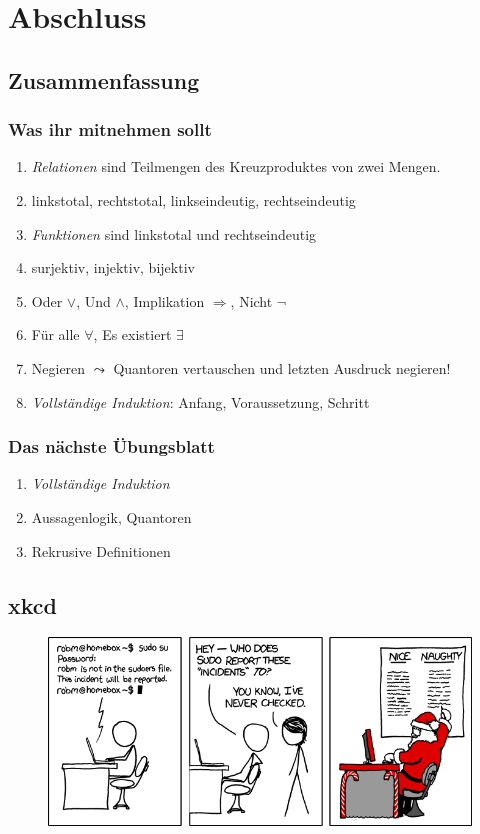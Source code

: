 \documentclass{beamer}
\begin{document}





\section{Abschluss}
\subsection{Zusammenfassung}
\begin{frame}
  \frametitle{Was ihr mitnehmen sollt}
  \begin{enumerate}
    \item \emph{Relationen} sind Teilmengen des Kreuzproduktes von zwei Mengen.
    \item linkstotal, rechtstotal, linkseindeutig, rechtseindeutig
    \item \emph{Funktionen} sind linkstotal und rechtseindeutig
    \item surjektiv, injektiv, bijektiv
    \item Oder $\vee$, Und $\wedge$, Implikation $\Rightarrow$, Nicht $\neg$
    \item Für alle $\forall$, Es existiert $\exists$
    \item Negieren $\leadsto$ Quantoren vertauschen und letzten Ausdruck negieren!
    \item \emph{Vollständige Induktion}: Anfang, Voraussetzung, Schritt
   \end{enumerate}
\end{frame}
\begin{frame}
  \frametitle{Das nächste Übungsblatt}
  \begin{enumerate}
    \item \emph{Vollständige Induktion}
    \item Aussagenlogik, Quantoren
    \item Rekrusive Definitionen
   \end{enumerate}
\end{frame}

\subsection{xkcd}
\begin{frame}[plain]
  \begin{figure}
    \begin{center}
      \includegraphics[width=320pt]{incident}
    \end{center}
  \end{figure}
\end{frame}
\end{document}
